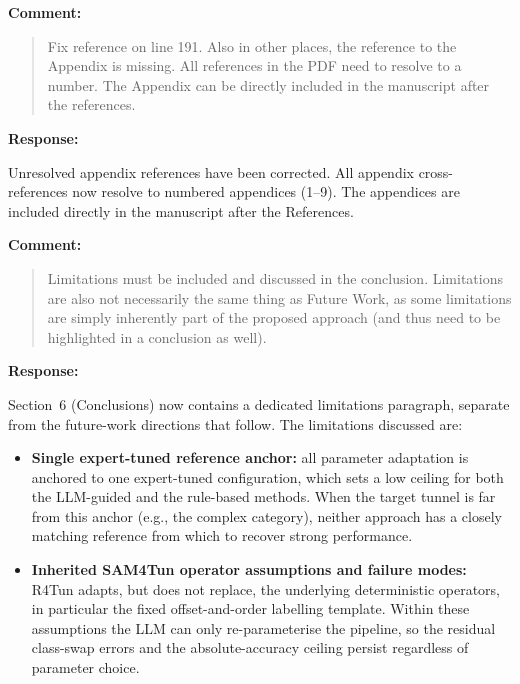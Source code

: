 \documentclass[11pt,a4paper]{article}
\newenvironment{commentblock}{%
  \par\smallskip\noindent\textbf{Comment:}\par
  \begin{quote}\itshape\color{black}
}{%
  \end{quote}\smallskip
}
\newenvironment{responseblock}{%
  \par\smallskip\noindent\textbf{Response:}\par
  \begingroup\color{responsegreen}
}{%
  \endgroup\smallskip
}
\begin{document}
\begin{commentblock}
Fix reference on line 191. Also in other places, the reference to the Appendix is missing. All references in the PDF need to resolve to a number. The Appendix can be directly included in the manuscript after the references.
\end{commentblock}
\begin{responseblock}
Unresolved appendix references have been corrected. All appendix cross-references now resolve to numbered appendices (1--9). The appendices are included directly in the manuscript after the References.
\end{responseblock}

\begin{commentblock}
Limitations must be included and discussed in the conclusion. Limitations are also not necessarily the same thing as Future Work, as some limitations are simply inherently part of the proposed approach (and thus need to be highlighted in a conclusion as well).
\end{commentblock}


\begin{responseblock}
Section~6 (Conclusions) now contains a dedicated limitations paragraph, separate from the future-work directions that follow. The limitations discussed are:
\begin{itemize}[nosep]
  \item \textbf{Single expert-tuned reference anchor:} all parameter adaptation is anchored to one expert-tuned configuration, which sets a low ceiling for both the LLM-guided and the rule-based methods. When the target tunnel is far from this anchor (e.g., the complex category), neither approach has a closely matching reference from which to recover strong performance.
  \item \textbf{Inherited SAM4Tun operator assumptions and failure modes:} R4Tun adapts, but does not replace, the underlying deterministic operators, in particular the fixed offset-and-order labelling template. Within these assumptions the LLM can only re-parameterise the pipeline, so the residual class-swap errors and the absolute-accuracy ceiling persist regardless of parameter choice.
\end{itemize}
\end{responseblock}
\end{document}
